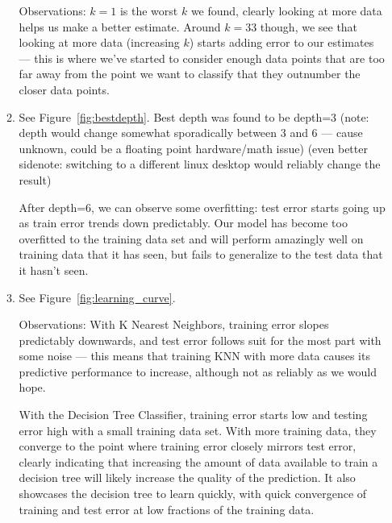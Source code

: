 \documentclass[11pt]{article}
\begin{document}
\begin{itemize}
\begin{enumerate}
        Observations: $k=1$ is the worst $k$ we found, clearly looking at more
        data helps us make a better estimate. Around $k=33$ though, we see that
        looking at more data (increasing $k$) starts adding error to our
        estimates --- this is where we've started to consider enough data points
        that are too far away from the point we want to classify that they
        outnumber the closer data points.

      \item See Figure~\ref{fig:bestdepth}. Best depth was found to be depth=3
        (note: depth would change somewhat sporadically between 3 and 6 ---
        cause unknown, could be a floating point hardware/math issue) (even
        better sidenote: switching to a different linux desktop would reliably
        change the result)

        After depth=6, we can observe some overfitting: test error starts going
        up as train error trends down predictably. Our model has become too
        overfitted to the training data set and will perform amazingly well on
        training data that it has seen, but fails to generalize to the test
        data that it hasn't seen.

      \item See Figure~\ref{fig:learning_curve}.
        
        Observations: With K Nearest Neighbors, training error slopes
        predictably downwards, and test error follows suit for the most part
        with some noise --- this means that training KNN with more data causes
        its predictive performance to increase, although not as reliably as we
        would hope.

        With the Decision Tree Classifier, training error starts low and testing
        error high with a small training data set. With more training data, they
        converge to the point where training error closely mirrors test error,
        clearly indicating that increasing the amount of data available to train
        a decision tree will likely increase the quality of the prediction. It
        also showcases the decision tree to learn quickly, with quick
        convergence of training and test error at low fractions of the training
        data.


\end{enumerate}
\end{itemize}
\end{document}
